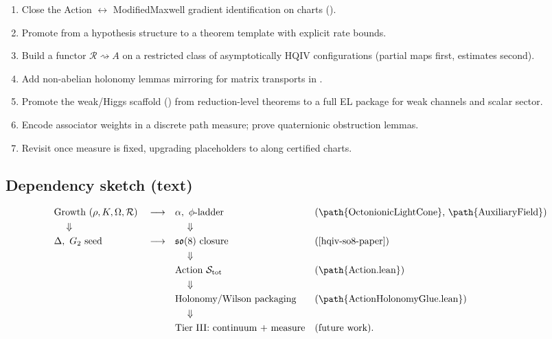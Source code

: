 \documentclass[11pt]{amsart}
\begin{document}
\begin{enumerate}
\item Close the Action \(\leftrightarrow\) ModifiedMaxwell gradient identification on charts ().
\item Promote  from a hypothesis structure to a theorem template with explicit rate bounds.
\item Build a functor \(\mathcal{R}\rightsquigarrow A\) on a restricted class of asymptotically HQIV configurations (partial maps first, estimates second).
\item Add non-abelian holonomy lemmas mirroring  for matrix transports in .
\item Promote the weak/Higgs scaffold () from reduction-level theorems to a full EL package for weak channels and scalar sector.
\item Encode associator weights in a discrete path measure; prove quaternionic obstruction lemmas.
\item Revisit  once measure is fixed, upgrading placeholders to  along certified charts.
\end{enumerate}

\subsection{Dependency sketch (text)}

\[
\begin{aligned}
&\text{Growth }(\rho,K,\Omega,\mathcal{R}) &&\longrightarrow &&\alpha,\ \phi\text{-ladder} &&\text{(\path{OctonionicLightCone}, \path{AuxiliaryField})}\\
&\quad\Downarrow && &&\quad\Downarrow \\
&\Delta,\ G_2\text{ seed} &&\longrightarrow &&\mathfrak{so}(8)\text{ closure} &&\text{(\cite{hqiv-so8-paper})}\\
&\quad && &&\quad\Downarrow \\
& && &&\text{Action } \mathcal{S}_{\mathrm{tot}}
&&\text{(\path{Action.lean})}\\
&\quad && &&\quad\Downarrow \\
& && &&\text{Holonomy/Wilson packaging}
&&\text{(\path{ActionHolonomyGlue.lean})}\\
&\quad && &&\quad\Downarrow \\
& && &&\text{Tier III: continuum + measure}
&&\text{(future work).}
\end{aligned}
\]
\end{document}
